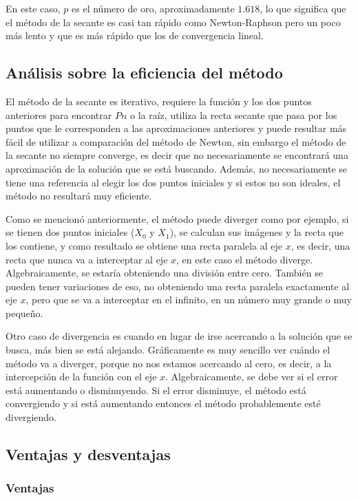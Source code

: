 En este caso, $p$ es el número de oro, aproximadamente $1.618$, lo que significa que el método de la secante es casi tan rápido como Newton-Raphson pero un poco más lento y que es más rápido que los de convergencia lineal.

\subsection{Análisis sobre la eficiencia del método}

El método de la secante es iterativo, requiere la función y los dos puntos anteriores para encontrar $Pn$ o la raíz, utiliza la recta secante que pasa por los puntos que le corresponden a las aproximaciones anteriores y puede resultar más fácil de utilizar a comparación del método de Newton, sin embargo el método de la secante no siempre converge, es decir que no necesariamente se encontrará una aproximación de la solución que se está buscando.  Además, no necesariamente se tiene una referencia al elegir los dos puntos iniciales y si estos no son ideales, el método no resultará muy eficiente. 

Como se mencionó anteriormente, el método puede diverger como por ejemplo, si se tienen dos puntos iniciales ($X_0$ y $X_1$), se calculan sus imágenes y la recta que los contiene, y como resultado se obtiene una recta paralela al eje $x$, es decir, una recta que nunca va a interceptar al eje $x$, en este caso el método diverge. Algebraicamente, se estaría obteniendo una división entre cero. También se pueden tener variaciones de eso, no obteniendo una recta paralela exactamente al eje $x$, pero que se va a interceptar en el infinito, en un número muy grande o muy pequeño.


Otro caso de divergencia es cuando en lugar de irse acercando a la solución que se busca, más bien se está alejando. Gráficamente es muy sencillo ver cuándo el método va a diverger, porque no nos estamos acercando al cero, es decir, a la intercepción de la función con el eje $x$. Algebraicamente, se debe ver si el error está aumentando o disminuyendo. Si el error disminuye, el método está convergiendo y si está aumentando entonces el método probablemente esté divergiendo. 


\subsection{Ventajas y desventajas}

\subsubsection{Ventajas}

